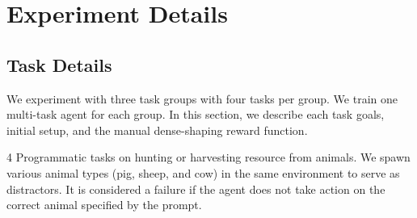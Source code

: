 


\section{Experiment Details}
\label{supp:sec:experiments}

\subsection{Task Details}
\label{supp:sec:task_details}
We experiment with three task groups with four tasks per group. We train one multi-task agent for each group. In this section, we describe each task goals, initial setup, and the manual dense-shaping reward function.

 4 Programmatic tasks on hunting or harvesting resource from animals. We spawn various animal types (pig, sheep, and cow) in the same environment to serve as distractors. It is considered a failure if the agent does not take action on the correct animal specified by the prompt.

